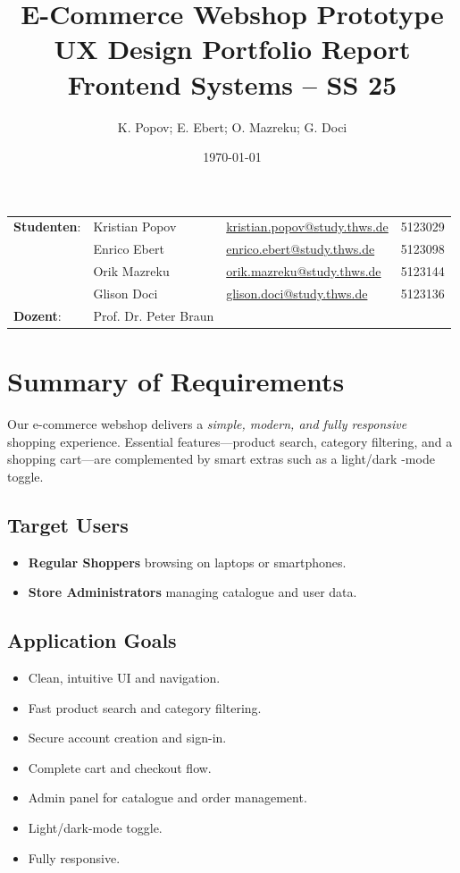 \documentclass[12pt]{article}
\title{
		{\LARGE \textbf{E-Commerce Webshop Prototype
	UX Design Portfolio Report}}\\[5ex]
	{\large Frontend Systems – SS 25}\\[5ex]
}
\author{K. Popov; E. Ebert; O. Mazreku; G. Doci}
\date{\today}
\begin{document}
	\maketitle
	\noindent\begin{tabular}{@{}lllr}
				 \textbf{Studenten}:
				 & Kristian Popov         &\href{mailto:kristian.popov@study.thws.de}{kristian.popov@study.thws.de}           & 5123029
				 \\[2ex]& Enrico Ebert     &\href{mailto:enrico.ebert@study.thws.de}{enrico.ebert@study.thws.de} 			  & 5123098
				 \\[2ex]& Orik Mazreku        &\href{mailto:orik.mazreku@study.thws.de}{orik.mazreku@study.thws.de}           & 5123144
				 \\[2ex]& Glison Doci        &\href{mailto:glison.doci@study.thws.de}{glison.doci@study.thws.de}              & 5123136
				 \\[4ex]\textbf{Dozent}:      & Prof. Dr. Peter Braun
	\end{tabular}
	\newpage

	\tableofcontents
	\newpage

	\section{Summary of Requirements}\label{sec:project-overview}
	Our e-commerce webshop delivers a \emph{simple, modern, and fully responsive} shopping experience. Essential features—product search, category filtering, and a shopping cart—are complemented by smart extras such as a light/dark -mode toggle.
	
	\subsection*{Target Users}
	\begin{itemize}
		\item \textbf{Regular Shoppers} browsing on laptops or smartphones.
		\item \textbf{Store Administrators} managing catalogue and user data.
	\end{itemize}
	
	\subsection*{Application Goals}
	\begin{itemize}
		\item Clean, intuitive UI and navigation.
		\item Fast product search and category filtering.
		\item Secure account creation and sign-in.
		\item Complete cart and checkout flow.
		\item Admin panel for catalogue and order management.
		\item Light/dark-mode toggle.
		\item Fully responsive.

	\end{itemize}
\end{document}

